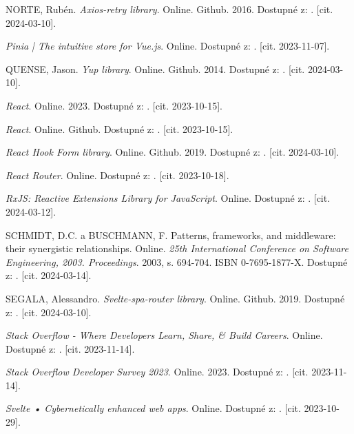 \begin{thebibliography}{99}
\textsc{NORTE}, Rubén. \emph{Axios-retry library}. Online. Github. 2016. Dostupné z: . [cit. 2024-03-10].

\emph{Pinia | The intuitive store for Vue.js}. Online. Dostupné z: . [cit. 2023-11-07].

\textsc{QUENSE}, Jason. \emph{Yup library}. Online. Github. 2014. Dostupné z: . [cit. 2024-03-10].

\emph{React}. Online. 2023. Dostupné z: . [cit. 2023-10-15].

\emph{React}. Online. Github. Dostupné z: . [cit. 2023-10-15].

\emph{React Hook Form library}. Online. Github. 2019. Dostupné z: . [cit. 2024-03-10].

\emph{React Router}. Online. Dostupné z: . [cit. 2023-10-18].

\emph{RxJS: Reactive Extensions Library for JavaScript}. Online. Dostupné z: . [cit. 2024-03-12].

\textsc{SCHMIDT}, D.C. a \textsc{BUSCHMANN}, F. Patterns, frameworks, and middleware: their synergistic relationships. Online. \emph{25th International Conference on Software Engineering, 2003. Proceedings}. 2003, s. 694-704. ISBN 0-7695-1877-X. Dostupné z: . [cit. 2024-03-14].

\textsc{SEGALA}, Alessandro. \emph{Svelte-spa-router library}. Online. Github. 2019. Dostupné z: . [cit. 2024-03-10].

\emph{Stack Overflow - Where Developers Learn, Share, \& Build Careers}. Online. Dostupné z: . [cit. 2023-11-14].

\emph{Stack Overflow Developer Survey 2023}. Online. 2023. Dostupné z: . [cit. 2023-11-14].

\emph{Svelte • Cybernetically enhanced web apps}. Online. Dostupné z: . [cit. 2023-10-29].


\end{thebibliography}

